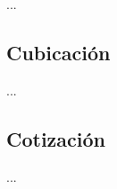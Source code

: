 \documentclass[12pt]{article}
\begin{document}
\qquad ...

\newpage
\subsection{Cubicación}

\qquad ...


\newpage
\subsection{Cotización}

\qquad ...


\newpage






\end{document}
